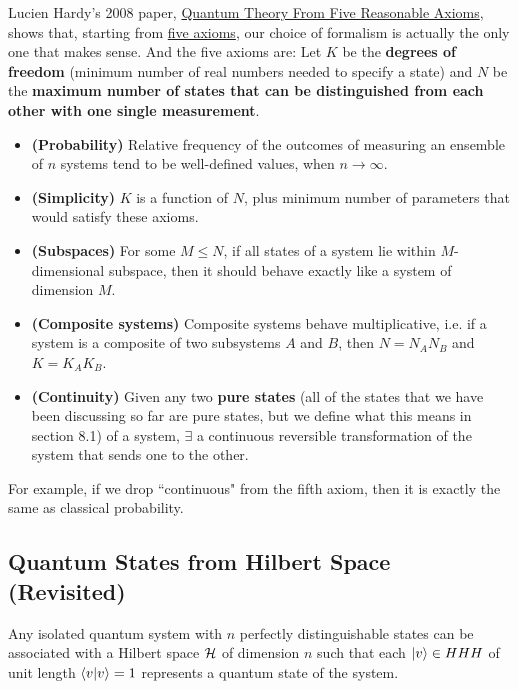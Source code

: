 \documentclass[12pt]{article}
\begin{document}
\begin{theorem}
Lucien Hardy's 2008 paper, \href{https://arxiv.org/pdf/quant-ph/0101012.pdf}{Quantum Theory From Five Reasonable Axioms}, shows that, starting from \underline{five axioms}, our choice of formalism is actually the only one that makes sense. And the five axioms are: Let \underline{$K$} be the \textbf{degrees of freedom} (minimum number of real numbers needed to specify a state) and \underline{$N$} be the \textbf{maximum number of states that can be distinguished from each other with one single measurement}.
\begin{itemize}
    \item \textbf{(Probability)} Relative frequency of the outcomes of measuring an ensemble of $n$ systems tend to be well-defined values, when $n\rightarrow \infty$.
    \item \textbf{(Simplicity)} $K$ is a function of $N$, plus minimum number of parameters that would satisfy these axioms.
    \item \textbf{(Subspaces)} For some $M\leq N$, if all states of a system lie within $M$-dimensional subspace, then it should behave exactly like a system of dimension $M$.
    \item \textbf{(Composite systems)} Composite systems behave multiplicative, i.e. if a system is a composite of two subsystems $A$ and $B$, then $N = N_A N_B$ and $K = K_AK_B$.
    \item \textbf{(Continuity)} Given any two \textbf{pure states} (all of the states that we have been discussing so far are pure states, but we define what this means in section 8.1) of a system, $\exists$ a continuous reversible transformation of the system that sends one to the other.
\end{itemize}
\end{theorem}

\begin{remark}
For example, if we drop ``continuous" from the fifth axiom, then it is exactly the same as classical probability.
\end{remark}

\subsection{Quantum States from Hilbert Space (Revisited)}
\begin{proposition}
Any isolated quantum system with $n$ perfectly distinguishable states can be associated with a Hilbert space $\HHH$ of dimension $n$ such that each $\Ket{v}\in HHH$ of unit length $\bk{v}{v} = 1$ represents a quantum state of the system.
\end{proposition}
\end{document}
